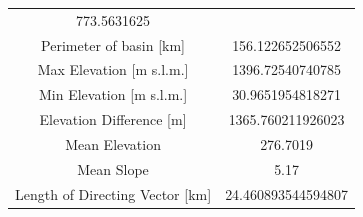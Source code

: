 \documentclass[11pt,]{article}
\begin{document}
\begin{longtable}[]{@{}cc@{}}
\begin{minipage}[t]{0.29\columnwidth}
773.5631625\strut
\end{minipage}\tabularnewline
\begin{minipage}[t]{0.65\columnwidth}\centering\strut
Perimeter of basin {[}km{]}\strut
\end{minipage} & \begin{minipage}[t]{0.29\columnwidth}\centering\strut
156.122652506552\strut
\end{minipage}\tabularnewline
\begin{minipage}[t]{0.65\columnwidth}\centering\strut
Max Elevation {[}m s.l.m.{]}\strut
\end{minipage} & \begin{minipage}[t]{0.29\columnwidth}\centering\strut
1396.72540740785\strut
\end{minipage}\tabularnewline
\begin{minipage}[t]{0.65\columnwidth}\centering\strut
Min Elevation {[}m s.l.m.{]}\strut
\end{minipage} & \begin{minipage}[t]{0.29\columnwidth}\centering\strut
30.9651954818271\strut
\end{minipage}\tabularnewline
\begin{minipage}[t]{0.65\columnwidth}\centering\strut
Elevation Difference {[}m{]}\strut
\end{minipage} & \begin{minipage}[t]{0.29\columnwidth}\centering\strut
1365.760211926023\strut
\end{minipage}\tabularnewline
\begin{minipage}[t]{0.65\columnwidth}\centering\strut
Mean Elevation\strut
\end{minipage} & \begin{minipage}[t]{0.29\columnwidth}\centering\strut
276.7019\strut
\end{minipage}\tabularnewline
\begin{minipage}[t]{0.65\columnwidth}\centering\strut
Mean Slope\strut
\end{minipage} & \begin{minipage}[t]{0.29\columnwidth}\centering\strut
5.17\strut
\end{minipage}\tabularnewline
\begin{minipage}[t]{0.65\columnwidth}\centering\strut
Length of Directing Vector {[}km{]}\strut
\end{minipage} & \begin{minipage}[t]{0.29\columnwidth}\centering\strut
24.460893544594807\strut
\end{minipage}\tabularnewline

\end{longtable}
\end{document}

